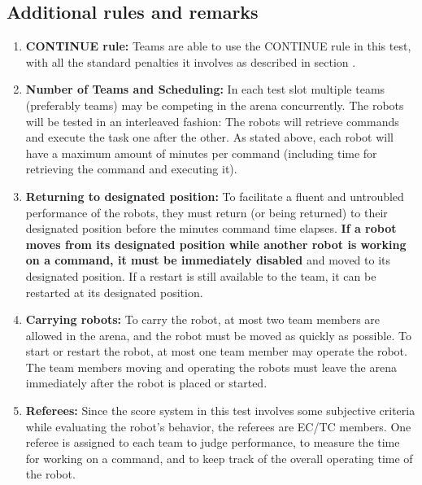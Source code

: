 \subsection{Additional rules and remarks}
\label{sec:eegpsr-remarks}
\begin{enumerate}
	\item \textbf{CONTINUE rule:} Teams are able to use the CONTINUE rule in this test, with all the standard penalties it involves as described in section . \\

	\item \textbf{Number of Teams and Scheduling:} In each test slot multiple teams (preferably \eegpsrTeams teams) may be competing in the arena concurrently. The robots will be tested in an interleaved fashion: The robots will retrieve commands and execute the task one after the other. As stated above, each robot will have a maximum amount of \eegpsrMaxCmdTime minutes per command (including time for retrieving the command and executing it). \\
	
	\item \textbf{Returning to designated position:} To facilitate a fluent and untroubled performance of the robots, they must return (or being returned) to their designated position before the \eegpsrMaxCmdTime minutes command time elapses. \textbf{If a robot moves from its designated position while another robot is working on a command, it must be immediately disabled} and moved to its designated position. If a restart is still available to the team, it can be restarted at its designated position. \\

	\item \textbf{Carrying robots:}	To carry the robot, at most two team members are allowed in the arena, and the robot must be moved as quickly as possible. To start or restart the robot, at most one team member may operate the robot. The team members moving and operating the robots must leave the arena immediately after the robot is placed or started. \\

	\item \textbf{Referees:} Since the score system in this test involves some subjective criteria while evaluating the robot's behavior, the referees are EC/TC members. One referee is assigned to each team to judge performance, to measure the time for working on a command, and to keep track of the overall operating time of the robot. \\


\end{enumerate}
